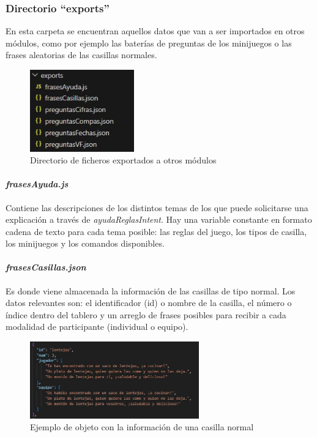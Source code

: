 \subsubsection{Directorio \enquote{exports}}

En esta carpeta se encuentran aquellos datos que van a ser importados en otros módulos, como por ejemplo las baterías de preguntas de los minijuegos o las frases aleatorias de las casillas normales.

\begin{figure}[H]
	\centering
	\includegraphics[width=0.4\textwidth]{imgs/exp-carpeta.jpg}
	\caption{Directorio de ficheros exportados a otros módulos}
	\label{fig:exp-carpeta}
\end{figure}

\paragraph{\textit{frasesAyuda.js}}

Contiene las descripciones de los distintos temas de los que puede solicitarse una explicación a través de \textit{ayudaReglasIntent}. Hay una variable constante en formato cadena de texto para cada tema posible: las reglas del juego, los tipos de casilla, los minijuegos y los comandos disponibles.

\paragraph{\textit{frasesCasillas.json}}

Es donde viene almacenada la información de las casillas de tipo normal. Los datos relevantes son: el identificador (id) o nombre de la casilla, el número o índice dentro del tablero y un arreglo de frases posibles para recibir a cada modalidad de participante (individual o equipo).

\begin{figure}[H]
	\centering
	\includegraphics[width=0.65\textwidth]{imgs/exp-casillas.jpg}
	\caption{Ejemplo de objeto con la información de una casilla normal}
	\label{fig:exp-casillas}
\end{figure}

